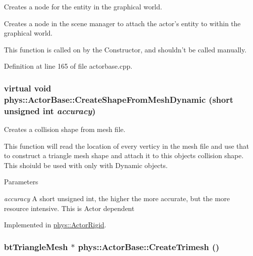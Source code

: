 Creates a node for the entity in the graphical world. 

Creates a node in the scene manager to attach the actor's entity to within the graphical world. \par
 This function is called on by the Constructor, and shouldn't be called manually. 

Definition at line 165 of file actorbase.cpp.

\hypertarget{classphys_1_1ActorBase_aa41370f6d2031a9dad8df45bd7f3bcc6}{
\subsubsection[{CreateShapeFromMeshDynamic}]{\setlength{\rightskip}{0pt plus 5cm}virtual void phys::ActorBase::CreateShapeFromMeshDynamic (short unsigned int {\em accuracy})}}
\label{d8/d0f/classphys_1_1ActorBase_aa41370f6d2031a9dad8df45bd7f3bcc6}


Creates a collision shape from mesh file. 

This function will read the location of every verticy in the mesh file and use that to construct a triangle mesh shape and attach it to this objects collision shape. This shoiuld be used with only with Dynamic objects. 
\begin{DoxyParams}{Parameters}
\item[{\em accuracy}]A short unsigned int, the higher the more accurate, but the more resource intensive. This is Actor dependent \end{DoxyParams}


Implemented in \hyperlink{classphys_1_1ActorRigid_aab4a408ce0724be6adf4c9f51f55f8a1}{phys::ActorRigid}.

\hypertarget{classphys_1_1ActorBase_a4d2137276c50bbe5bc8cf9ecc66581b7}{
\subsubsection[{CreateTrimesh}]{\setlength{\rightskip}{0pt plus 5cm}btTriangleMesh $\ast$ phys::ActorBase::CreateTrimesh ()}}
\label{d8/d0f/classphys_1_1ActorBase_a4d2137276c50bbe5bc8cf9ecc66581b7}


